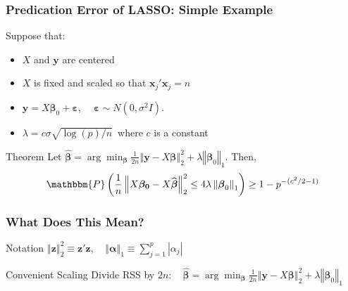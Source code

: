 \begin{frame}
  \frametitle{Predication Error of LASSO: Simple Example}
  \begin{block}{Suppose that:}
    \begin{itemize}
      \item $X$ and $\mathbf{y}$ are centered
      \item $X$ is fixed and scaled so that $\mathbf{x}_j'\mathbf{x}_j = n$
      \item $\mathbf{y} = X\boldsymbol{\beta}_0 + \boldsymbol{\varepsilon}$, $\quad \boldsymbol{\varepsilon} \sim N(0,\sigma^2 I)$.
      \item $\lambda = c \sigma \sqrt{\log(p)/n}\,$ where $c$ is a constant
    \end{itemize}
  \end{block}

  \begin{alertblock}{Theorem}
    Let $\widehat{\boldsymbol{\beta}} = \arg \min_{\boldsymbol{\beta}} \frac{1}{2n} \left\Vert \mathbf{y} - X\boldsymbol{\beta}\right\Vert_2^2 +  \lambda \left\Vert \boldsymbol{\beta}_0\right\Vert_1$.
    Then, 
    \[
      \mathbbm{P}\left(\frac{1}{n}\left\Vert X\boldsymbol{\beta_0} - X\widehat{\boldsymbol{\beta}} \right\Vert_2^2 \leq 4 \lambda \left \Vert \boldsymbol{\beta}_0 \right\Vert_1\right) \geq 1 - p^{-(c^2/2 - 1)}
    \]
  \end{alertblock}

\end{frame}
\begin{frame}
  \frametitle{What Does This Mean?}

  \begin{block}{Notation}
    $\left\Vert \mathbf{z} \right\Vert_2^2 \equiv \mathbf{z}'\mathbf{z}, \quad \left\Vert \boldsymbol{\alpha} \right\Vert_1 \equiv \sum_{j=1}^p \left| \alpha_j \right|$
  \end{block}

  \begin{block}{Convenient Scaling} 
    Divide RSS by $2n\colon \quad \widehat{\boldsymbol{\beta}} = \arg \min_{\boldsymbol{\beta}} \displaystyle\frac{1}{2n} \left\Vert \mathbf{y} - X\boldsymbol{\beta}\right\Vert_2^2 +  \lambda \left\Vert \boldsymbol{\beta}_0\right\Vert_1$
  \end{block}

  
\end{frame}
